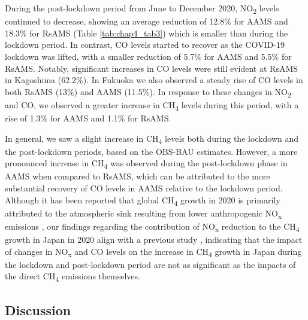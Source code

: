 During the post-lockdown period from June to December 2020, NO\textsubscript{2} levels continued to decrease, showing an average reduction of 12.8\% for AAMS and 18.3\% for RsAMS (Table \ref{tab:chap4_tab3}) which is smaller than during the lockdown period. In contrast, CO levels started to recover as the COVID-19 lockdown was lifted, with a smaller reduction of 5.7\% for AAMS and 5.5\% for RsAMS. Notably, significant increases in CO levels were still evident at RsAMS in Kagoshima (62.2\%). In Fukuoka we also observed a steady rise of CO levels in both RsAMS (13\%) and AAMS (11.5\%). In response to these changes in NO\textsubscript{2} and CO, we observed a greater increase in CH\textsubscript{4} levels during this period, with a rise of 1.3\% for AAMS and 1.1\% for RsAMS.\par
In general, we saw a slight increase in CH\textsubscript{4} levels both during the lockdown and the post-lockdown periods, based on the OBS-BAU estimates. However, a more pronounced increase in CH\textsubscript{4} was observed during the post-lockdown phase in AAMS when compared to RsAMS, which can be attributed to the more substantial recovery of CO levels in AAMS relative to the lockdown period. Although it has been reported that global CH\textsubscript{4} growth in 2020 is primarily attributed to the atmospheric sink resulting from lower anthropogenic NO\textsubscript{x} emissions \citep{stevenson2022covid,peng2022wetland}, our findings regarding the contribution of NO\textsubscript{x} reduction to the CH\textsubscript{4} growth in Japan in 2020 align with a previous study \citep{akimoto2022rethinking,qu2022attribution,feng2023methane}, indicating that the impact of changes in NO\textsubscript{x} and CO levels on the increase in CH\textsubscript{4} growth in Japan during the lockdown and post-lockdown period are not as significant as the impacts of the direct CH\textsubscript{4} emissions themselves. \par

\subsection{Discussion} \label{chap4_disscussion}
